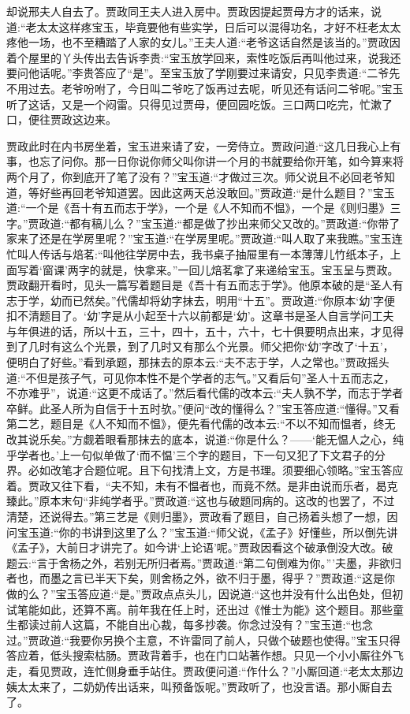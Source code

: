 \begin{parag}
    却说邢夫人自去了。贾政同王夫人进入房中。贾政因提起贾母方才的话来，说道:“老太太这样疼宝玉，毕竟要他有些实学，日后可以混得功名，才好不枉老太太疼他一场，也不至糟踏了人家的女儿。”王夫人道:“老爷这话自然是该当的。”贾政因着个屋里的丫头传出去告诉李贵:“宝玉放学回来，索性吃饭后再叫他过来，说我还要问他话呢。”李贵答应了“是”。至宝玉放了学刚要过来请安，只见李贵道:“二爷先不用过去。老爷吩咐了，今日叫二爷吃了饭再过去呢，听见还有话问二爷呢。”宝玉听了这话，又是一个闷雷。只得见过贾母，便回园吃饭。三口两口吃完，忙漱了口，便往贾政这边来。
\end{parag}


\begin{parag}
    贾政此时在内书房坐着，宝玉进来请了安，一旁侍立。贾政问道:“这几日我心上有事，也忘了问你。那一日你说你师父叫你讲一个月的书就要给你开笔，如今算来将两个月了，你到底开了笔了没有？”宝玉道:“才做过三次。师父说且不必回老爷知道，等好些再回老爷知道罢。因此这两天总没敢回。”贾政道:“是什么题目？”宝玉道:“一个是《吾十有五而志于学》，一个是《人不知而不愠》，一个是《则归墨》三字。”贾政道:“都有稿儿么？”宝玉道:“都是做了抄出来师父又改的。”贾政道:“你带了家来了还是在学房里呢？”宝玉道:“在学房里呢。”贾政道:“叫人取了来我瞧。”宝玉连忙叫人传话与焙茗:“叫他往学房中去，我书桌子抽屉里有一本薄薄儿竹纸本子，上面写着‘窗课’两字的就是，快拿来。”一回儿焙茗拿了来递给宝玉。宝玉呈与贾政。贾政翻开看时，见头一篇写着题目是《吾十有五而志于学》。他原本破的是“圣人有志于学，幼而已然矣。”代儒却将幼字抹去，明用“十五”。贾政道:“你原本‘幼’字便扣不清题目了。‘幼’字是从小起至十六以前都是‘幼’。这章书是圣人自言学问工夫与年俱进的话，所以十五，三十，四十，五十，六十，七十俱要明点出来，才见得到了几时有这么个光景，到了几时又有那么个光景。师父把你‘幼’字改了‘十五’，便明白了好些。”看到承题，那抹去的原本云:“夫不志于学，人之常也。”贾政摇头道:“不但是孩子气，可见你本性不是个学者的志气。”又看后句”圣人十五而志之，不亦难乎”，说道:“这更不成话了。”然后看代儒的改本云:“夫人孰不学，而志于学者卒鲜。此圣人所为自信于十五时欤。”便问“改的懂得么？”宝玉答应道:“懂得。”又看第二艺，题目是《人不知而不愠》，便先看代儒的改本云:“不以不知而愠者，终无改其说乐矣。”方觑着眼看那抹去的底本，说道:“你是什么？——‘能无愠人之心，纯乎学者也。’上一句似单做了‘而不愠’三个字的题目，下一句又犯了下文君子的分界。必如改笔才合题位呢。且下句找清上文，方是书理。须要细心领略。”宝玉答应着。贾政又往下看，“夫不知，未有不愠者也，而竟不然。是非由说而乐者，曷克臻此。”原本末句“非纯学者乎。”贾政道:“这也与破题同病的。这改的也罢了，不过清楚，还说得去。”第三艺是《则归墨》，贾政看了题目，自己扬着头想了一想，因问宝玉道:“你的书讲到这里了么？”宝玉道:“师父说，《孟子》好懂些，所以倒先讲《孟子》，大前日才讲完了。如今讲‘上论语’呢。”贾政因看这个破承倒没大改。破题云:“言于舍杨之外，若别无所归者焉。”贾政道:“第二句倒难为你。”’夫墨，非欲归者也，而墨之言已半天下矣，则舍杨之外，欲不归于墨，得乎？”贾政道:“这是你做的么？”宝玉答应道:“是。”贾政点点头儿，因说道:“这也并没有什么出色处，但初试笔能如此，还算不离。前年我在任上时，还出过《惟士为能》这个题目。那些童生都读过前人这篇，不能自出心裁，每多抄袭。你念过没有？”宝玉道:“也念过。”贾政道:“我要你另换个主意，不许雷同了前人，只做个破题也使得。”宝玉只得答应着，低头搜索枯肠。贾政背着手，也在门口站著作想。只见一个小小厮往外飞走，看见贾政，连忙侧身垂手站住。贾政便问道:“作什么？”小厮回道:“老太太那边姨太太来了，二奶奶传出话来，叫预备饭呢。”贾政听了，也没言语。那小厮自去了。

\end{parag}
